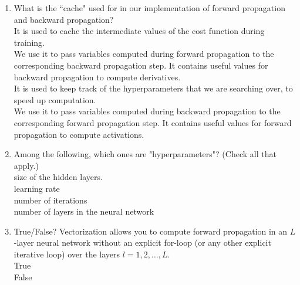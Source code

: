 \begin{enumerate}
    \item What is the ``cache" used for in our implementation of forward propagation and backward propagation? \\
        \hspace{1cm}\choice{}  It is used to cache the intermediate values of the cost function during training. \\
        \hspace{1cm}\checkmark{}  We use it to pass variables computed during forward propagation to the corresponding backward propagation step. It contains useful values for backward propagation to compute derivatives. \\ 
        \hspace{1cm}\choice{} It is used to keep track of the hyperparameters that we are searching over, to speed up computation. \\ 
        \hspace{1cm}\choice{}  We use it to pass variables computed during backward propagation to the corresponding forward propagation step. It contains useful values for forward propagation to compute activations. \\ 
    \solution{}

    \item Among the following, which ones are "hyperparameters"? (Check all that apply.) \\
    \hspace{1cm}\checkmark{} size of the hidden layers. \\ 
    \hspace{1cm}\checkmark{} learning rate\\ 
    \hspace{1cm}\checkmark{} number of iterations \\ 
    \hspace{1cm}\checkmark{} number of layers  in the neural network \\ 
    \solution{}


    \item True/False? Vectorization allows you to compute forward propagation in an $L$-layer neural network without an explicit for-loop (or any other explicit iterative loop) over the layers $l=1, 2,  \hdots, L$. \\
    \hspace{1cm}\choice{} True \\
        \hspace{1cm}\checkmark{} False \\ 
        \solution{}
    


\end{enumerate}
